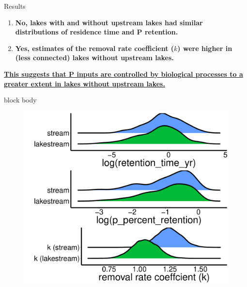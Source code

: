 \documentclass[final,hyperref={pdfpagelabels=false}]{beamer}
\begin{document}
\begin{frame}[t]
\begin{columns}[t]
\begin{column}{.465\textwidth}
\vspace{1em}

\begin{block}{Results}
\begin{enumerate}
\item \textbf{No, lakes with and without upstream lakes had similar distributions of residence time and P retention.}
\vspace{1em}
\item \textbf{Yes, estimates of the removal rate coefficient ($k$) were higher in (less connected) lakes without upstream lakes.}
\end{enumerate}
\vspace{1em}
\large \textbf{\ul{This suggests that P inputs are controlled by biological processes to a greater extent in lakes without upstream lakes.}}

\vspace{1em}
{
\begin{beamercolorbox}[wd=\textwidth,rounded=true]{block body}

\begin{figure}
  \includegraphics[width=30cm]{gleon_poster.pdf}
\end{figure}


\end{beamercolorbox}}
\end{block}
\end{column}
\end{columns}
\end{frame}
\end{document}
